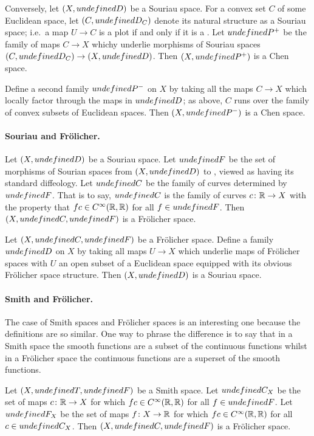 \documentclass[%
a4paper,%
arxiv,%
defaults
]{myclass}
\begin{document}
Conversely, let \((X, \m{D})\) be a Souriau space.
For a convex set \(C\) of some Euclidean space, let \((C, \m{D}_C)\) denote its natural structure as a Souriau space; i.e.\ a map \(U \to C\) is a plot if and only if it is a \cimap.
Let \(\m{P}^+\) be the family of maps \(C \to X\) whichy underlie morphisms of Souriau spaces \((C, \m{D}_C) \to (X, \m{D})\).
Then \((X, \m{P}^+)\) is a Chen space.

Define a second family \(\m{P}^-\) on \(X\) by taking all the maps \(C \to X\) which locally factor through the maps in \(\m{D}\); as above, \(C\) runs over the family of convex subsets of Euclidean spaces.
Then \((X, \m{P}^-)\) is a Chen space.

\paragraph{Souriau and Fr\"olicher.}

Let \((X, \m{D})\) be a Souriau space.
Let \(\m{F}\) be the set of morphisms of Sourian spaces from \((X, \m{D})\) to \R, viewed as having its standard diffeology.
Let \(\m{C}\) be the family of curves determined by \(\m{F}\).
That is to say, \(\m{C}\) is the family of curves \(c \colon \mathbb{R} \to X\) with the property that \(f c \in C^\infty(\mathbb{R},\mathbb{R})\) for all \(f \in \m{F}\).
Then \((X, \m{C}, \m{F})\) is a Fr\"olicher space.


Let \((X, \m{C}, \m{F})\) be a Fr\"olicher space.
Define a family \(\m{D}\) on \(X\) by taking all maps \(U \to X\) which underlie maps of Fr\"olicher spaces with \(U\) an open subset of a Euclidean space equipped with its obvious Fr\"olicher space structure.
Then \((X, \m{D})\) is a Souriau space.

\paragraph{Smith and Fr\"olicher.}

The case of Smith spaces and Fr\"olicher spaces is an interesting one because the definitions are so similar.
One way to phrase the difference is to say that in a Smith space the smooth functions are a subset of the continuous functions whilst in a Fr\"olicher space the continuous functions are a superset of the smooth functions.

Let \((X, \m{T}, \m{F})\) be a Smith space.
Let \(\m{C}_X\) be the set of maps \(c \colon \mathbb{R} \to X\) for which \(f c \in C^\infty(\mathbb{R}, \mathbb{R})\) for all \(f \in \m{F}\).
Let \(\m{F}_X\) be the set of maps \(f \colon X \to \mathbb{R}\) for which \(f c \in C^\infty(\mathbb{R},\mathbb{R})\) for all \(c \in \m{C}_X\).
Then \((X, \m{C}, \m{F})\) is a Fr\"olicher space.
\end{document}
